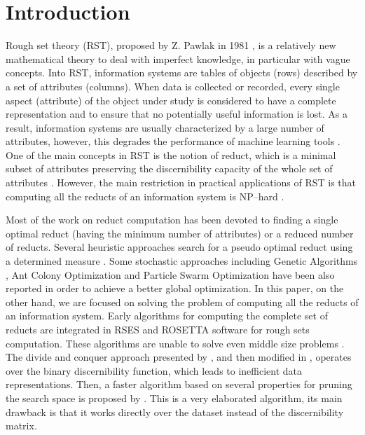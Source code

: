 \documentclass[authoryear,preprint,review,12pt]{elsarticle}
\begin{document}
\section{Introduction}
  Rough set theory (RST), proposed by Z. Pawlak in 1981 \citep{Pawlak81,Pawlak81-2,Pawlak82,Pawlak91}, 
  is a relatively new mathematical theory to deal with imperfect knowledge, in particular with vague 
  concepts. Into RST, information systems are tables of objects (rows) described by a set of attributes (columns). 
  When data is collected or recorded, every single aspect (attribute) of the object under study is considered 
  to have a complete representation and to ensure that no potentially useful information is lost.
  As a result, information systems are usually characterized by a large number of attributes,
  however, this degrades the performance of machine learning tools \citep{Parthalain08}.
  One of the main concepts in RST is the notion of reduct, which is a minimal subset of attributes 
  preserving the discernibility capacity of the whole set of attributes \citep{Pawlak91}.  
  However, the main restriction in practical applications of RST is that computing all the reducts of an 
  information system is NP--hard \citep{Skowron92}. 
  
  Most of the work on reduct computation has been devoted to finding a single optimal reduct (having the minimum 
  number of attributes) or a reduced number of reducts. Several heuristic approaches search for a pseudo optimal
  reduct using a determined measure \citep{Zheng14,Liang2014}. Some stochastic approaches including Genetic
  Algorithms \citep{Feng2012,Hedar2015}, Ant Colony Optimization \citep{Jensen03,Chebrolu2015} and Particle Swarm 
  Optimization \citep{Chen15,Luan2015} have been also reported in order to achieve a better global optimization. 
  In this paper, on the other hand, we are focused on solving the problem of computing all the reducts of an
  information system.
  Early algorithms for computing the complete set of reducts \citep{Bazan2001,Ohrn00} are integrated in RSES and
  ROSETTA software for rough sets computation. These algorithms are unable to solve even middle size problems
  \citep{Lazo15}. The divide and conquer approach presented by \cite{Starzyk99,Starzyk00}, and then modified in
  \citep{Jensen14}, operates over the binary discernibility function, which leads to inefficient data 
  representations. Then, a faster algorithm based on several properties for pruning the search space is proposed
  by \cite{WangP07}. This is a very elaborated algorithm, its main drawback is that it works directly
  over the dataset instead of the discernibility matrix.   
     	
\end{document}
